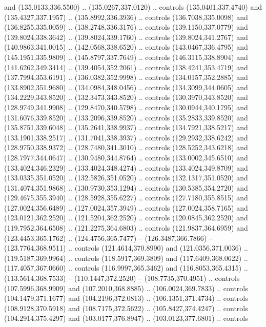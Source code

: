 \begin{scope}[cm={{1.25,0.0,0.0,-1.25,(0.0,743.43331)}}]
    and (135.0133,336.5500) .. (135.0267,337.0120) .. controls (135.0401,337.4740)
    and (135.4327,337.1957) .. (135.8992,336.3936) .. controls (136.7038,335.0098)
    and (136.8255,335.0059) .. (138.2748,336.3176) .. controls (139.1150,337.0779)
    and (139.8024,338.3642) .. (139.8024,339.1760) .. controls (139.8024,341.2767)
    and (140.9863,341.0015) .. (142.0568,338.6520) .. controls (143.0467,336.4795)
    and (145.1951,335.9809) .. (145.8797,337.7649) .. controls (146.3115,338.8904)
    and (141.6262,349.3414) .. (139.4054,352.2061) .. controls (138.4241,353.4719)
    and (137.7994,353.6191) .. (136.0382,352.9998) .. controls (134.0157,352.2885)
    and (133.8902,351.9680) .. (134.0984,348.0456) .. controls (134.3099,344.0605)
    and (134.2229,343.8520) .. (132.3473,343.8520) .. controls (130.3970,343.8520)
    and (128.9749,341.9908) .. (129.8470,340.5798) .. controls (130.0944,340.1795)
    and (131.6076,339.8520) .. (133.2096,339.8520) .. controls (135.2833,339.8520)
    and (135.8751,339.6048) .. (135.2641,338.9937) .. controls (134.7921,338.5217)
    and (133.1901,338.2517) .. (131.7041,338.3937) .. controls (129.2932,338.6242)
    and (128.9750,338.9372) .. (128.7480,341.3010) .. controls (128.5252,343.6218)
    and (128.7977,344.0647) .. (130.9480,344.8764) .. controls (133.0002,345.6510)
    and (133.4024,346.2329) .. (133.4024,348.4274) .. controls (133.4024,349.8709)
    and (133.0335,351.0520) .. (132.5826,351.0520) .. controls (132.1317,351.0520)
    and (131.4074,351.9868) .. (130.9730,353.1294) .. controls (130.5385,354.2720)
    and (129.4675,355.3940) .. (128.5928,355.6227) .. controls (127.7180,355.8515)
    and (127.0024,356.6489) .. (127.0024,357.3949) .. controls (127.0024,358.7165)
    and (123.0121,362.2520) .. (121.5204,362.2520) .. controls (120.0845,362.2520)
    and (119.7952,364.6508) .. (121.2275,364.6803) .. controls (121.9837,364.6959)
    and (123.4453,365.1762) .. (124.4756,365.7477) -- (126.3487,366.7866) --
    (123.7764,368.9511) .. controls (121.4614,370.8990) and (121.0356,371.0036) ..
    (119.5187,369.9964) .. controls (118.5917,369.3809) and (117.6409,368.0622) ..
    (117.4057,367.0660) .. controls (116.9997,365.3462) and (116.8053,365.4315) ..
    (113.5614,368.7533) -- (110.1447,372.2520) -- (108.7735,370.4951) .. controls
    (107.5996,368.9909) and (107.2010,368.8885) .. (106.0024,369.7833) .. controls
    (104.1479,371.1677) and (104.2196,372.0813) .. (106.1351,371.4734) .. controls
    (108.9128,370.5918) and (108.7175,372.5622) .. (105.8427,374.4247) .. controls
    (104.2914,375.4297) and (103.0177,376.8947) .. (103.0123,377.6801) .. controls

\end{scope}
